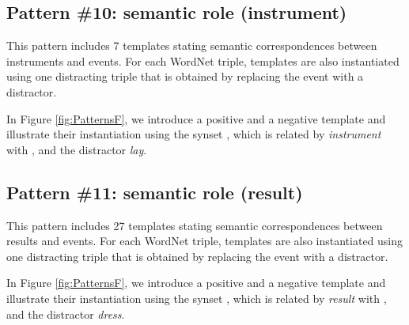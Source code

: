 \documentclass[11pt]{article}
\newcommand{\WORDNET}{WordNet}
\begin{document}
\subsection{Pattern \#10: semantic role (instrument)}

This pattern includes 7 templates stating semantic correspondences between instruments and events. For each \WORDNET{} triple, templates are also instantiated using one distracting triple that is obtained by replacing the event with a distractor.

In Figure \ref{fig:PatternsF}, we introduce a positive and a negative template and illustrate their instantiation using the synset , which is related by {\it instrument} with , and the distractor {\it lay}.

\subsection{Pattern \#11: semantic role (result)}

This pattern includes 27 templates stating semantic correspondences between results and events. For each \WORDNET{} triple, templates are also instantiated using one distracting triple that is obtained by replacing the event with a distractor.

In Figure \ref{fig:PatternsF}, we introduce a positive and a negative template and illustrate their instantiation using the synset , which is related by {\it result} with , and the distractor {\it dress}.
\end{document}

